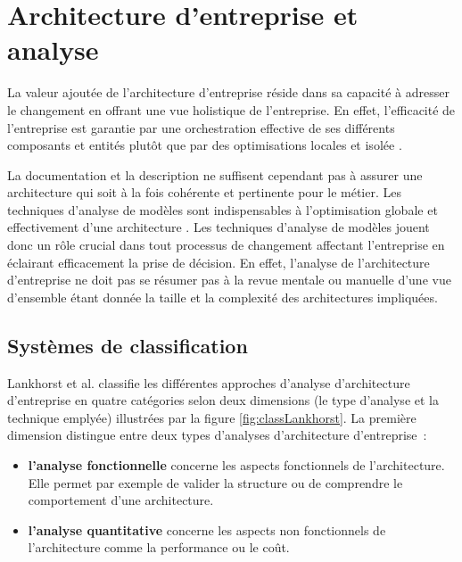 \section{Architecture d'entreprise et analyse}
La valeur ajoutée de l'architecture d'entreprise réside dans sa capacité à adresser le changement en offrant une vue holistique de l'entreprise. En effet, l'efficacité de l'entreprise  est garantie par une orchestration effective de ses différents composants et entités plutôt que par des optimisations locales et isolée \cite{nadler1992organizational}. 

La documentation et la description ne suffisent cependant pas à assurer une architecture qui soit à la fois cohérente et pertinente pour le métier. Les techniques d'analyse de modèles sont indispensables à l'optimisation globale et effectivement d'une architecture \cite{lankhorst2009enterprise}. Les techniques d'analyse de modèles jouent donc un rôle crucial dans tout processus de changement affectant l'entreprise en éclairant efficacement la prise de décision. En effet, l'analyse de l'architecture d'entreprise ne doit pas se résumer pas à la revue mentale ou manuelle d'une vue d'ensemble étant donnée la taille et la complexité des architectures impliquées.

\subsection{Systèmes de classification}
Lankhorst et al. \cite{lankhorst2009enterprise} classifie les différentes approches d'analyse d'architecture d'entreprise en quatre catégories selon deux dimensions (le type d'analyse et la technique emplyée) illustrées par la figure \ref{fig:classLankhorst}. La première dimension distingue entre deux types d'analyses d'architecture d'entreprise~:
	\begin{itemize}
		\item \textbf{l'analyse fonctionnelle} concerne les aspects fonctionnels de l'architecture. Elle permet par exemple de valider la structure ou de comprendre le comportement d'une architecture.
		\item \textbf{l'analyse quantitative} concerne les aspects non fonctionnels de l'architecture comme la performance ou le coût. 
\end{itemize}

 
